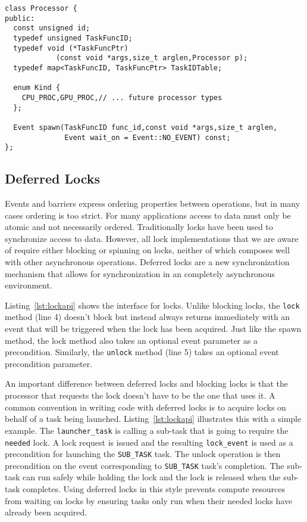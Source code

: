 \begin{lstlisting}[float={t},label={lst:procapi},caption={Processor Interface.}]
class Processor {
public:
  const unsigned id;
  typedef unsigned TaskFuncID;
  typedef void (*TaskFuncPtr)
            (const void *args,size_t arglen,Processor p);
  typedef map<TaskFuncID, TaskFuncPtr> TaskIDTable;

  enum Kind {
    CPU_PROC,GPU_PROC,// ... future processor types
  };

  Event spawn(TaskFuncID func_id,const void *args,size_t arglen,
              Event wait_on = Event::NO_EVENT) const;
};
\end{lstlisting}

\subsection{Deferred Locks}
\label{subsec:locks}

Events and barriers express ordering properties between operations, but in many
cases ordering is too strict.  For many applications access to data must only be atomic and
not necessarily ordered.  Traditionally locks have been used to synchronize access
to data.  However, all lock implementations that we are aware of require either blocking
or spinning on locks, neither of which composes well with other asynchronous operations.
Deferred locks are a new synchronization mechanism that allows for synchronization
in an completely asynchronous environment.  

Listing~\ref{lst:lockapi} shows the 
interface for locks.  Unlike blocking locks, the {\tt lock} method (line 4) doesn't
block but instead always returns immediately with an event that will be triggered
when the lock has been acquired.  Just like the spawn method, the lock method also 
takes an optional event parameter as a precondition.  Similarly, the {\tt unlock} 
method (line 5) takes an optional event precondition parameter.

An important difference between deferred locks and blocking locks is that the processor
that requests the lock doesn't have to be the one that uses it.  A common
convention in writing code with deferred locks is to acquire locks on behalf of a task being
launched.  Listing~\ref{lst:lockapi} illustrates this with a simple example.  The
{\tt launcher\_task} is calling a sub-task that is going to require the {\tt needed}
lock.  A lock request is issued and the resulting {\tt lock\_event} is used as
a precondition for launching the {\tt SUB\_TASK} task.  The unlock operation is then
precondition on the event corresponding to {\tt SUB\_TASK} task's completion.  The
sub-task can run safely while holding the lock and the lock is released when the
sub-task completes.  Using deferred locks in this style prevents 
compute resources from waiting on locks by ensuring tasks only run when their needed
locks have already been acquired.

